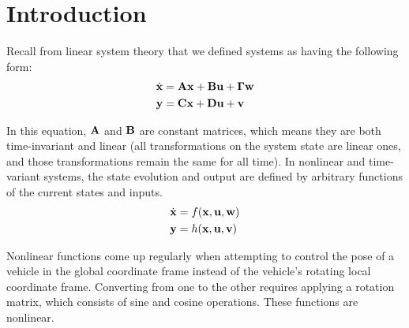 \section{Introduction}

Recall from linear \gls{system} theory that we defined \glspl{system} as having
the following form:
\begin{align*}
  \dot{\mathbf{x}} &= \mathbf{A}\mathbf{x} + \mathbf{B}\mathbf{u} + \mathbf{\Gamma}\mathbf{w} \\
  \mathbf{y} &= \mathbf{C}\mathbf{x} + \mathbf{D}\mathbf{u} + \mathbf{v}
\end{align*}

In this equation, $\mathbf{A}$ and $\mathbf{B}$ are constant matrices, which means
they are both time-invariant and linear (all transformations on the \gls{system}
\gls{state} are linear ones, and those transformations remain the same for all
time). In nonlinear and time-variant \glspl{system}, the \gls{state} evolution
and \gls{output} are defined by arbitrary functions of the current \glspl{state}
and \glspl{input}.
\begin{align*}
  \dot{\mathbf{x}} &= f(\mathbf{x}, \mathbf{u}, \mathbf{w}) \\
  \mathbf{y} &= h(\mathbf{x}, \mathbf{u}, \mathbf{v})
\end{align*}

Nonlinear functions come up regularly when attempting to control the \gls{pose}
of a vehicle in the global coordinate frame instead of the vehicle's rotating
local coordinate frame. Converting from one to the other requires applying a
rotation matrix, which consists of sine and cosine operations. These functions
are nonlinear.
